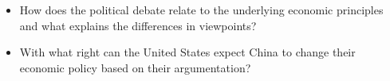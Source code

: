 \begin{itemize}
\item{How does the political debate relate to the underlying economic 
principles and what explains the differences in viewpoints?}
\item{With what right can the United States expect China to change their 
economic policy based on their argumentation?}
\end{itemize}
